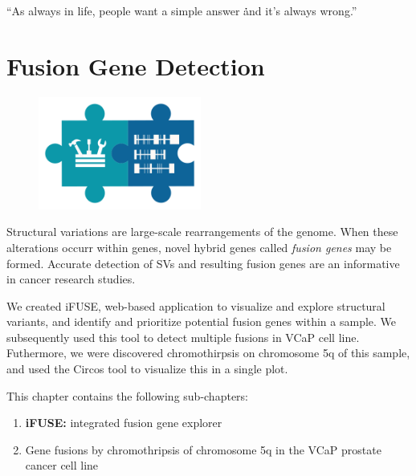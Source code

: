 \begin{savequote}[75mm]
“As always in life, people want a simple answer \. \. \. and it’s always wrong.”
\end{savequote}

\chapter{Fusion Gene Detection}\label{chapter:fusiongenes}
\setcounter{figure}{-1}
\setcounter{table}{-1}
\setcounter{section}{-1}

\begin{figure}[t!]
\includegraphics[height=10em]{frontmatter/images/chapter-header-fusion-tools.png}
\end{figure}
\setcounter{figure}{-1}
\setcounter{table}{-1}
\setcounter{section}{-1}


Structural variations are large-scale rearrangements of the genome. When these alterations occurr within genes, novel hybrid genes called \emph{fusion genes} may be formed. Accurate detection of SVs and resulting fusion genes are an informative in cancer research studies.

We created iFUSE, web-based application to visualize and explore structural variants, and identify and prioritize potential fusion genes within a sample. We subsequently used this tool to detect multiple fusions in VCaP cell line. Futhermore, we were discovered chromothirpsis on chromosome 5q of this sample, and used the Circos tool to visualize this in a single plot.

This chapter contains the following sub-chapters:

\begin{enumerate}[label=\ref{chapter:fusiongenes}.\arabic*]
\itemsep-0.5em
\setcounter{enumi}{-1}
\item \textbf{iFUSE:} integrated fusion gene explorer
\item Gene fusions by chromothripsis of chromosome 5q in the VCaP prostate cancer cell line
\end{enumerate}
